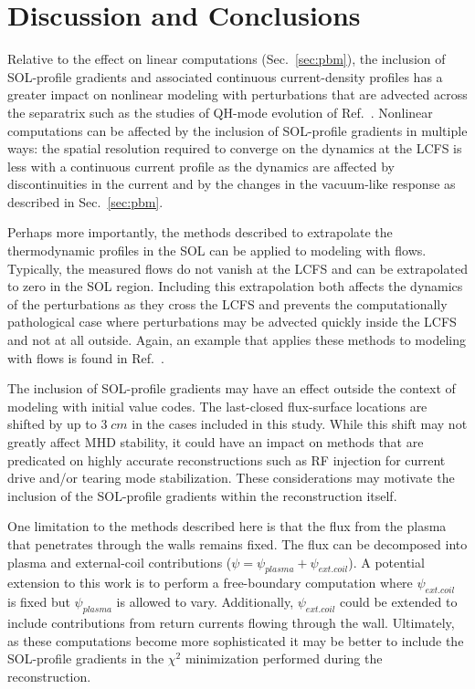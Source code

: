 \documentclass[english,aps,superscriptaddress,showkeys,showpacs,prepri,twocolumn]{revtex4}
\begin{document}
\section{Discussion and Conclusions} 
\label{sec:conclusions}

Relative to the effect on linear computations (Sec.~\ref{sec:pbm}),
the inclusion of SOL-profile gradients and associated continuous
current-density profiles has a greater impact on nonlinear modeling with
perturbations that are advected across the separatrix such as the studies of
QH-mode evolution of Ref.~\cite{King16qh}.  Nonlinear computations can be
affected by the inclusion of SOL-profile gradients in multiple ways: the
spatial resolution required to converge on the dynamics at the LCFS is less
with a continuous current profile as the dynamics are affected by
discontinuities in the current and by the changes in the vacuum-like response
as described in Sec.~\ref{sec:pbm}.

Perhaps more importantly, the methods described to extrapolate the
thermodynamic profiles in the SOL can be applied to modeling with flows.
Typically, the measured flows do not vanish at the LCFS and can be extrapolated
to zero in the SOL region.  Including this extrapolation both affects the
dynamics of the perturbations as they cross the LCFS and prevents the
computationally pathological case where perturbations may be advected quickly
inside the LCFS and not at all outside. Again, an example that applies these
methods to modeling with flows is found in Ref.~\cite{King16qh}.

The inclusion of SOL-profile gradients may have an effect outside the context
of modeling with initial value codes. The last-closed flux-surface locations
are shifted by up to $3\;cm$ in the cases included in this study.  While this
shift may not greatly affect MHD stability, it could have an impact on methods
that are predicated on highly accurate reconstructions such as RF injection for
current drive and/or tearing mode stabilization. These considerations may
motivate the inclusion of the SOL-profile gradients within the reconstruction
itself.

One limitation to the methods described here is that the flux from the plasma
that penetrates through the walls remains fixed. The flux can be decomposed
into plasma and external-coil contributions ($\psi = \psi_{plasma} + \psi_{ext.
coil}$).  A potential extension to this work is to perform a free-boundary
computation where $\psi_{ext. coil}$ is fixed but $\psi_{plasma}$ is allowed to
vary.  Additionally, $\psi_{ext. coil}$ could be extended to include
contributions from return currents flowing through the wall.  Ultimately, as
these computations become more sophisticated it may be better to include the
SOL-profile gradients in the $\chi^2$ minimization performed during the
reconstruction.
\end{document}
